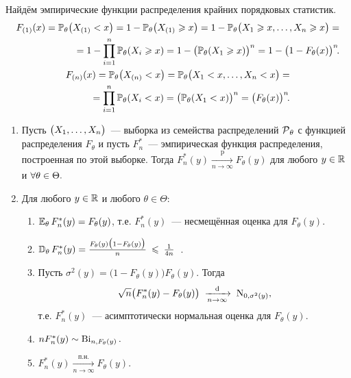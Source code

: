 \begin{exmp}
    Найдём эмпирические функции распределения крайних порядковых статистик.
    \begin{gather*}
        \begin{aligned}
            F_{(1)}(x)=\operatorname{\operatorname{\mathbb{P}}_{\theta}} \bigl(X_{(1)} < x \bigr) 
        = 1 - \operatorname{\operatorname{\mathbb{P}}_{\theta}} \bigl(X_{(1)} \geqslant x \bigr) 
        = 1 - \operatorname{\operatorname{\mathbb{P}}_{\theta}} \bigl(X_{1} \geqslant x, \ldots, X_{n} \geqslant x\bigr) = \\
        = 1 - \prod_{i=1}^{n} \operatorname{\operatorname{\mathbb{P}}_{\theta}} (X_{i} \geqslant x)
        = 1 - \bigl(\operatorname{\operatorname{\mathbb{P}}_{\theta}} ({X}_{1} \geqslant x)\bigr)^{n} 
        = 1 - \bigl(1 - F_{\theta}(x)\bigr)^{n}\!.
        \end{aligned} \\
        \begin{aligned}
            F_{(n)}(x) 
            = \operatorname{\operatorname{\mathbb{P}}_{\theta}} \bigl(X_{(n)} < x\bigr) 
            = \operatorname{\operatorname{\mathbb{P}}_{\theta}} \bigl(X_{1} < x, \ldots, X_{n} < x\bigr) = \\
            = \prod_{i=1}^{n} \operatorname{\operatorname{\mathbb{P}}_{\theta}} (X_{i} < x)
            = \bigl(\operatorname{\operatorname{\mathbb{P}}_{\theta}} ({X}_{1} < x)\bigr)^{n} 
            = \bigl( F_{\theta}(x) \bigr)^n \!.
        \end{aligned}
    \end{gather*}
\end{exmp}

\begin{namedthm}\leavevmode
    \begin{enumerate}
        \item Пусть $\bigl(X_1, \ldots, X_n \bigr)$~--- выборка из семейства распределений $\operatorname{\mathcal{P}}_{\theta}$ с функцией распределения $F_{\theta}$ и пусть $F_{n}^{*}$~--- эмпирическая функция распределения, построенная по этой выборке. 
        Тогда $F_{n}^{*}(y) \xrightarrow[n \to \infty]{\text{p}} F_{\theta}(y)$ для любого $y \in \mathbb{R}$ и $\forall \theta \in \Theta.$
        \item Для любого $y \in \mathbb{R}$ и любого $\theta \in \Theta$:
        \begin{enumerate}[label={\arabic*)}]
            \item $\operatorname{\operatorname{\mathbb{E}}_{\theta}} F_{n}^{*}(y) = F_{\theta}(y)$, т.е. $F_{n}^{*}(y)$~--- несмещённая оценка для $F_{\theta}(y)$.
            \item $\operatorname{\mathbb{D}_{\theta}} F_{n}^{*}(y)=\frac{F_{\theta}(y)\bigl(1-F_{\theta}(y)\bigr)}{n} \: \leqslant \: \frac{1}{4n}$\, .
            \item Пусть $\sigma^2(y) = \bigl(1 - F_{\theta}(y)\bigr)F_{\theta}(y)$. 
            Тогда
            \begin{equation*}
                \sqrt{n}\bigl( F_{n}^{*}(y)-F_{\theta}(y) \bigr) \; \xrightarrow[n \to \infty]{\text{d}} \; \operatorname{\mathrm{N}}_{0, \sigma^2(y)},
            \end{equation*}
            т.е. $F_{n}^{*}(y)$~--- асимптотически нормальная оценка для $F_{\theta}(y)$.
            \item $n F_{n}^{*}(y) \sim \operatorname{\mathrm{Bi}}_{n, F_{\theta}(y)}.$
            \item $F_{n}^{*}(y) \xrightarrow[n \to \infty]{\text{п.н.}} F_{\theta}(y).$
        \end{enumerate}
    \end{enumerate}
\end{namedthm}

